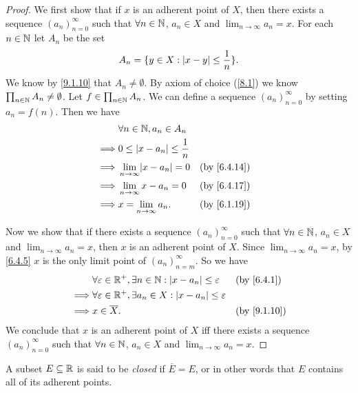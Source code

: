 \begin{proof}
  We first show that if \(x\) is an adherent point of \(X\), then there exists a sequence \((a_n)_{n = 0}^\infty\) such that \(\forall n \in \mathbb{N}\), \(a_n \in X\) and \(\lim_{n \to \infty} a_n = x\).
  For each \(n \in \mathbb{N}\) let \(A_n\) be the set
  \[
    A_n = \{y \in X : \left\lvert x - y\right\rvert \leq \dfrac{1}{n}\}.
  \]
  We know by \cref{9.1.10} that \(A_n \neq \emptyset\).
  By axiom of choice (\cref{8.1}) we know \(\prod_{n \in \mathbb{N}} A_n \neq \emptyset\).
  Let \(f \in \prod_{n \in \mathbb{N}} A_n\).
  We can define a sequence \((a_n)_{n = 0}^\infty\) by setting \(a_n = f(n)\).
  Then we have
  \begin{align*}
             & \forall n \in \N, a_n \in A_n                           \\
    \implies & 0 \leq \abs{x - a_n} \leq \dfrac{1}{n}                  \\
    \implies & \lim_{n \to \infty} \abs{x - a_n} = 0  &  & \by{6.4.14} \\
    \implies & \lim_{n \to \infty} x - a_n = 0        &  & \by{6.4.17} \\
    \implies & x = \lim_{n \to \infty} a_n.           &  & \by{6.1.19}
  \end{align*}

  Now we show that if there exists a sequence \((a_n)_{n = 0}^\infty\) such that \(\forall n \in \mathbb{N}\), \(a_n \in X\) and \(\lim_{n \to \infty} a_n = x\), then \(x\) is an adherent point of \(X\).
  Since \(\lim_{n \to \infty} a_n = x\), by \cref{6.4.5} \(x\) is the only limit point of \((a_n)_{n = m}^\infty\).
  So we have
  \begin{align*}
             & \forall \varepsilon \in \R^+, \exists n \in \N : \abs{x - a_n} \leq \varepsilon  &  & \by{6.4.1}  \\
    \implies & \forall \varepsilon \in \R^+, \exists a_n \in X : \abs{x - a_n} \leq \varepsilon                  \\
    \implies & x \in \overline{X}.                                                              &  & \by{9.1.10}
  \end{align*}
  We conclude that \(x\) is an adherent point of \(X\) iff there exists a sequence \((a_n)_{n = 0}^\infty\) such that \(\forall n \in \mathbb{N}\), \(a_n \in X\) and \(\lim_{n \to \infty} a_n = x\).
\end{proof}

\begin{defn}\label{9.1.15}
  A subset \(E \subseteq \mathbb{R}\) is said to be \emph{closed} if \(\overline{E} = E\), or in other words that \(E\) contains all of its adherent points.
\end{defn}

